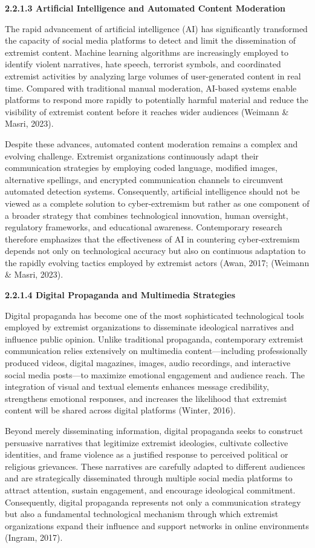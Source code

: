 \documentclass[11pt,a4paper]{article}
\begin{document}
	\textbf{2.2.1.3 Artificial Intelligence and Automated Content Moderation}
	
	The rapid advancement of artificial intelligence (AI) has significantly transformed the capacity of social media platforms to detect and limit the dissemination of extremist content. Machine learning algorithms are increasingly employed to identify violent narratives, hate speech, terrorist symbols, and coordinated extremist activities by analyzing large volumes of user-generated content in real time. Compared with traditional manual moderation, AI-based systems enable platforms to respond more rapidly to potentially harmful material and reduce the visibility of extremist content before it reaches wider audiences (Weimann \& Masri, 2023).
	
	Despite these advances, automated content moderation remains a complex and evolving challenge. Extremist organizations continuously adapt their communication strategies by employing coded language, modified images, alternative spellings, and encrypted communication channels to circumvent automated detection systems. Consequently, artificial intelligence should not be viewed as a complete solution to cyber-extremism but rather as one component of a broader strategy that combines technological innovation, human oversight, regulatory frameworks, and educational awareness. Contemporary research therefore emphasizes that the effectiveness of AI in countering cyber-extremism depends not only on technological accuracy but also on continuous adaptation to the rapidly evolving tactics employed by extremist actors (Awan, 2017; (Weimann \& Masri, 2023).
	
	\textbf{2.2.1.4 Digital Propaganda and Multimedia Strategies}
	
	Digital propaganda has become one of the most sophisticated technological tools employed by extremist organizations to disseminate ideological narratives and influence public opinion. Unlike traditional propaganda, contemporary extremist communication relies extensively on multimedia content---including professionally produced videos, digital magazines, images, audio recordings, and interactive social media posts---to maximize emotional engagement and audience reach. The integration of visual and textual elements enhances message credibility, strengthens emotional responses, and increases the likelihood that extremist content will be shared across digital platforms (Winter, 2016).
	
	Beyond merely disseminating information, digital propaganda seeks to construct persuasive narratives that legitimize extremist ideologies, cultivate collective identities, and frame violence as a justified response to perceived political or religious grievances. These narratives are carefully adapted to different audiences and are strategically disseminated through multiple social media platforms to attract attention, sustain engagement, and encourage ideological commitment. Consequently, digital propaganda represents not only a communication strategy but also a fundamental technological mechanism through which extremist organizations expand their influence and support networks in online environments (Ingram, 2017).
	
\end{document}
